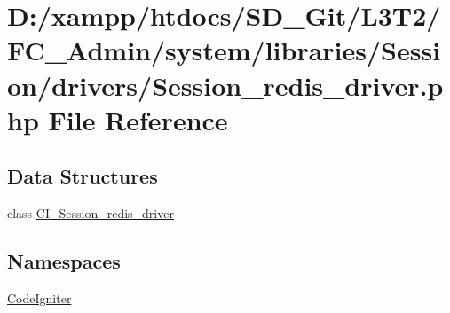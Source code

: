 \hypertarget{_admin_2system_2libraries_2_session_2drivers_2_session__redis__driver_8php}{}\section{D\+:/xampp/htdocs/\+S\+D\+\_\+\+Git/\+L3\+T2/\+F\+C\+\_\+\+Admin/system/libraries/\+Session/drivers/\+Session\+\_\+redis\+\_\+driver.php File Reference}
\label{_admin_2system_2libraries_2_session_2drivers_2_session__redis__driver_8php}
\subsection*{Data Structures}
\begin{DoxyCompactItemize}
\item 
class \hyperlink{class_c_i___session__redis__driver}{C\+I\+\_\+\+Session\+\_\+redis\+\_\+driver}
\end{DoxyCompactItemize}
\subsection*{Namespaces}
\begin{DoxyCompactItemize}
\item 
 \hyperlink{namespace_code_igniter}{Code\+Igniter}
\end{DoxyCompactItemize}

